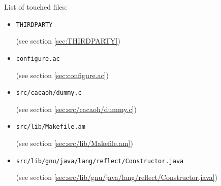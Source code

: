 \documentclass[a4paper, 10pt, titlepage]{scrartcl} %
\begin{document}
\begin{bfseries}List of touched files:\end{bfseries}
\begin{itemize}
 \item \begin{scriptsize}\verb|THIRDPARTY|\end{scriptsize} (see section \ref{sec:THIRDPARTY})
 \item \begin{scriptsize}\verb|configure|\hspace{0.0pt}\verb|.|\hspace{0.0pt}\verb|ac|\end{scriptsize} (see section \ref{sec:configure.ac})
 \item \begin{scriptsize}\verb|src|\hspace{0.0pt}\verb|/|\hspace{0.0pt}\verb|cacaoh|\hspace{0.0pt}\verb|/|\hspace{0.0pt}\verb|dummy|\hspace{0.0pt}\verb|.|\hspace{0.0pt}\verb|c|\end{scriptsize} (see section \ref{sec:src/cacaoh/dummy.c})
 \item \begin{scriptsize}\verb|src|\hspace{0.0pt}\verb|/|\hspace{0.0pt}\verb|lib|\hspace{0.0pt}\verb|/|\hspace{0.0pt}\verb|Makefile|\hspace{0.0pt}\verb|.|\hspace{0.0pt}\verb|am|\end{scriptsize} (see section \ref{sec:src/lib/Makefile.am})
 \item \begin{scriptsize}\verb|src|\hspace{0.0pt}\verb|/|\hspace{0.0pt}\verb|lib|\hspace{0.0pt}\verb|/|\hspace{0.0pt}\verb|gnu|\hspace{0.0pt}\verb|/|\hspace{0.0pt}\verb|java|\hspace{0.0pt}\verb|/|\hspace{0.0pt}\verb|lang|\hspace{0.0pt}\verb|/|\hspace{0.0pt}\verb|reflect|\hspace{0.0pt}\verb|/|\hspace{0.0pt}\verb|Constructor|\hspace{0.0pt}\verb|.|\hspace{0.0pt}\verb|java|\end{scriptsize} (see section \ref{sec:src/lib/gnu/java/lang/reflect/Constructor.java})

\end{itemize}
\end{document}
